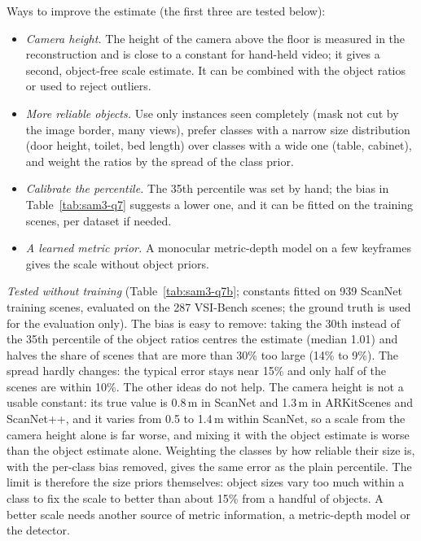 Ways to improve the estimate (the first three are tested below):
\begin{itemize}
\item \emph{Camera height.} The height of the camera above the floor is measured in the reconstruction and is
      close to a constant for hand-held video; it gives a second, object-free scale estimate. It can be combined
      with the object ratios or used to reject outliers.
\item \emph{More reliable objects.} Use only instances seen completely (mask not cut by the image border, many
      views), prefer classes with a narrow size distribution (door height, toilet, bed length) over classes with
      a wide one (table, cabinet), and weight the ratios by the spread of the class prior.
\item \emph{Calibrate the percentile.} The 35th percentile was set by hand; the bias in Table~\ref{tab:sam3-q7}
      suggests a lower one, and it can be fitted on the training scenes, per dataset if needed.
\item \emph{A learned metric prior.} A monocular metric-depth model on a few keyframes gives the scale without
      object priors.
\end{itemize}

\emph{Tested without training} (Table~\ref{tab:sam3-q7b}; constants fitted on 939 ScanNet training scenes, evaluated on
the 287 VSI-Bench scenes; the ground truth is used for the evaluation only).
The bias is easy to remove: taking the 30th instead of the 35th percentile of the object ratios centres the
estimate (median 1.01) and halves the share of scenes that are more than 30\% too large (14\% to 9\%). The spread
hardly changes: the typical error stays near 15\% and only half of the scenes are within 10\%. The other ideas
do not help. The camera height is not a usable constant: its true value is 0.8\,m in ScanNet and 1.3\,m in
ARKitScenes and ScanNet++, and it varies from 0.5 to 1.4\,m within ScanNet, so a scale from the camera height
alone is far worse, and mixing it with the object estimate is worse than the object estimate alone. Weighting
the classes by how reliable their size is, with the per-class bias removed, gives the same error as the plain
percentile. The limit is therefore the size priors themselves: object sizes vary too much within a class to fix
the scale to better than about 15\% from a handful of objects. A better scale needs another source of metric
information, a metric-depth model or the detector.

